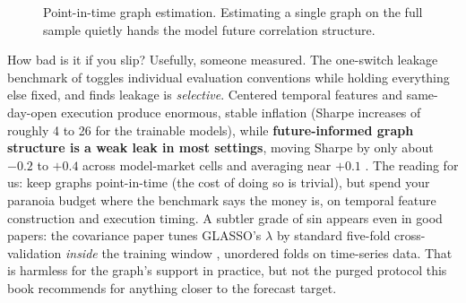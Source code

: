 \begin{figure}[ht]
\centering
{}
\caption{Point-in-time graph estimation. Estimating a single graph on the full sample quietly hands the model future correlation structure.}
\label{fig:gnn:leakage-timeline}
\end{figure}

How bad is it if you slip? Usefully, someone measured. The one-switch leakage benchmark of \citet{ZhangLiPengChen2026} toggles individual evaluation conventions while holding everything else fixed, and finds leakage is \emph{selective}. Centered temporal features and same-day-open execution produce enormous, stable inflation (Sharpe increases of roughly 4 to 26 for the trainable models), while \textbf{future-informed graph structure is a weak leak in most settings}, moving Sharpe by only about $-0.2$ to $+0.4$ across model-market cells and averaging near $+0.1$ \citep[Table~1, p.~6]{ZhangLiPengChen2026}. The reading for us: keep graphs point-in-time (the cost of doing so is trivial), but spend your paranoia budget where the benchmark says the money is, on temporal feature construction and execution timing. A subtler grade of sin appears even in good papers: the covariance paper tunes GLASSO's $\lambda$ by standard five-fold cross-validation \emph{inside} the training window \citep[p.~8]{ZhangPuCucuringuDong2024}, unordered folds on time-series data. That is harmless for the graph's support in practice, but not the purged protocol this book recommends for anything closer to the forecast target.

